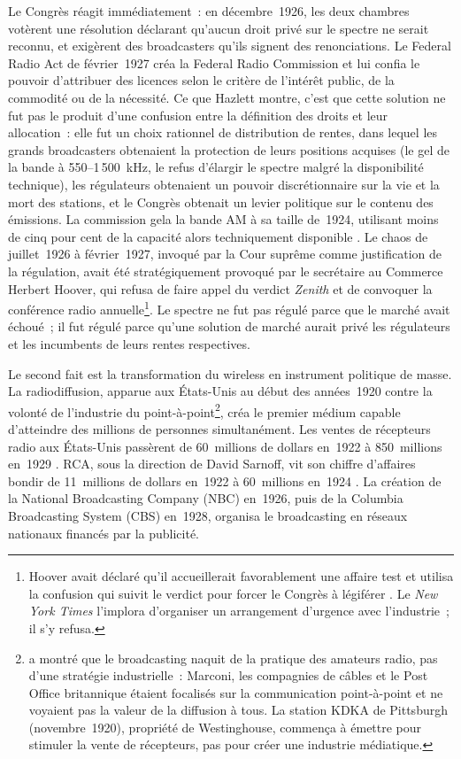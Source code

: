 %
Le Congrès réagit immédiatement~: en décembre~1926, les deux chambres votèrent une résolution déclarant qu'aucun droit privé sur le spectre ne serait reconnu, et exigèrent des broadcasters qu'ils signent des renonciations. Le Federal Radio Act de février~1927 créa la Federal Radio Commission et lui confia le pouvoir d'attribuer des licences selon le critère de l'\og intérêt public, de la commodité ou de la nécessité\fg{}. Ce que Hazlett montre, c'est que cette solution ne fut pas le produit d'une confusion entre la définition des droits et leur allocation~: elle fut un choix rationnel de distribution de rentes, dans lequel les grands broadcasters obtenaient la protection de leurs positions acquises (le gel de la bande à 550--1\,500~kHz, le refus d'élargir le spectre malgré la disponibilité technique), les régulateurs obtenaient un pouvoir discrétionnaire sur la vie et la mort des stations, et le Congrès obtenait un levier politique sur le contenu des émissions. La commission gela la bande AM à sa taille de~1924, utilisant moins de cinq pour cent de la capacité alors techniquement disponible \parencite{hazlett_rationality_1990}. Le \og chaos\fg{} de juillet~1926 à février~1927, invoqué par la Cour suprême comme justification de la régulation, avait été stratégiquement provoqué par le secrétaire au Commerce Herbert Hoover, qui refusa de faire appel du verdict \emph{Zenith} et de convoquer la conférence radio annuelle\footnote{Hoover avait déclaré qu'il \og accueillerait favorablement une affaire test\fg{} et utilisa la confusion qui suivit le verdict pour forcer le Congrès à légiférer \parencite{hazlett_rationality_1990}. Le \emph{New York Times} l'implora d'organiser un arrangement d'urgence avec l'industrie~; il s'y refusa.}. Le spectre ne fut pas régulé parce que le marché avait échoué~; il fut régulé parce qu'une solution de marché aurait privé les régulateurs et les incumbents de leurs rentes respectives.

%
Le second fait est la transformation du wireless en instrument politique de masse. La radiodiffusion, apparue aux États-Unis au début des années~1920 contre la volonté de l'industrie du point-à-point\footnote{\textcite{douglas_inventing_1987} a montré que le broadcasting naquit de la pratique des amateurs radio, pas d'une stratégie industrielle~: Marconi, les compagnies de câbles et le Post Office britannique étaient focalisés sur la communication point-à-point et ne voyaient pas la valeur de la diffusion à tous. La station KDKA de Pittsburgh (novembre~1920), propriété de Westinghouse, commença à émettre pour stimuler la vente de récepteurs, pas pour créer une industrie médiatique.}, créa le premier médium capable d'atteindre des millions de personnes simultanément. Les ventes de récepteurs radio aux États-Unis passèrent de 60~millions de dollars en~1922 à 850~millions en~1929 \parencite{kooij_information_2022}. RCA, sous la direction de David Sarnoff, vit son chiffre d'affaires bondir de 11~millions de dollars en~1922 à 60~millions en~1924 \parencite{kooij_information_2022}. La création de la National Broadcasting Company (NBC) en~1926, puis de la Columbia Broadcasting System (CBS) en~1928, organisa le broadcasting en réseaux nationaux financés par la publicité.

